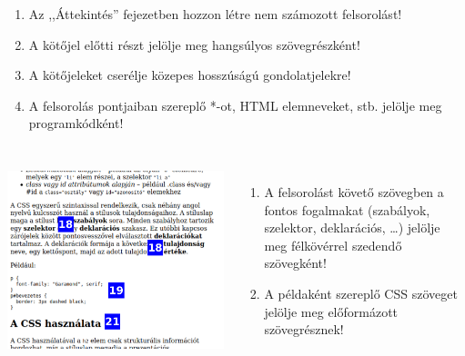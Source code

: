 \begin{frame}
\begin{columns}[c]
\begin{enumerate}
        \item Az ,,Áttekintés'' fejezetben hozzon létre nem számozott felsorolást!
        \item A kötőjel előtti részt jelölje meg hangsúlyos szövegrészként!
        \item A kötőjeleket cserélje közepes hosszúságú gondolatjelekre!
        \item A felsorolás pontjaiban szereplő *-ot, HTML elemneveket, stb. jelölje meg programkódként!
        \setcounter{feladatSzamlalo}{\theenumi}
      \end{enumerate}
  \end{columns}
\end{frame}

\begin{frame}
  \begin{columns}[c]
      \begin{exampleblock}{}
        \includegraphics[width=\textwidth]{css3.pdf}
      \end{exampleblock}
      \begin{enumerate}
        \setcounter{enumi}{\thefeladatSzamlalo}
        \small
        \item A felsorolást követő szövegben a fontos fogalmakat (szabályok, szelektor, deklarációs, \dots) jelölje meg félkövérrel szedendő szövegként!
        \item A példaként szereplő CSS szöveget jelölje meg előformázott szövegrésznek!

\end{enumerate}
\end{columns}
\end{frame}
